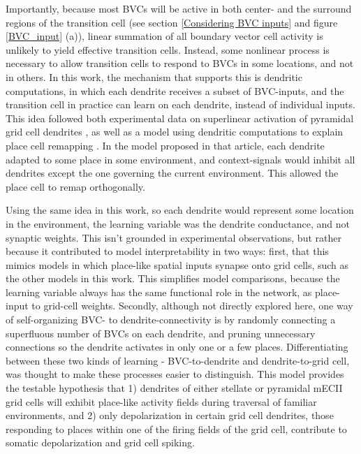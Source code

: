 \documentclass{article}
\begin{document}
    Importantly, because most BVCs will be active in both center- and the surround regions of the transition cell (see section \ref{Considering BVC inputs} and figure \ref{BVC_input} (a)), linear summation of all boundary vector cell activity is unlikely to yield effective transition cells. Instead, some nonlinear process is necessary to allow transition cells to respond to BVCs in some locations, and not in others. In this work, the mechanism that supports this is dendritic computations, in which each dendrite receives a subset of BVC-inputs, and the transition cell in practice can learn on each dendrite, instead of individual inputs. This idea followed both experimental data on superlinear activation of pyramidal grid cell dendrites \parencite{Schmidt-Hieber2017}, as well as a model using dendritic computations to explain place cell remapping \parencite{Alabi2022}. In the model proposed in that article, each dendrite adapted to some place in some environment, and context-signals would inhibit all dendrites except the one governing the current environment. This allowed the place cell to remap orthogonally.

    Using the same idea in this work, so each dendrite would represent some location in the environment, the learning variable was the dendrite conductance, and not synaptic weights. This isn't grounded in experimental observations, but rather because it contributed to model interpretability in two ways: first, that this mimics models in which place-like spatial inputs synapse onto grid cells, such as the other models in this work. This simplifies model comparisons, because the learning variable always has the same functional role in the network, as place-input to grid-cell weights. Secondly, although not directly explored here, one way of self-organizing BVC- to dendrite-connectivity is by randomly connecting a superfluous number of BVCs on each dendrite, and pruning unnecessary connections so the dendrite activates in only one or a few places. Differentiating between these two kinds of learning - BVC-to-dendrite and dendrite-to-grid cell, was thought to make these processes easier to distinguish. 
    This model provides the testable hypothesis that 1) dendrites of either stellate or pyramidal mECII grid cells will exhibit place-like activity fields during traversal of familiar environments, and 2) only depolarization in certain grid cell dendrites, those responding to places within one of the firing fields of the grid cell, contribute to somatic depolarization and grid cell spiking.
\end{document}
